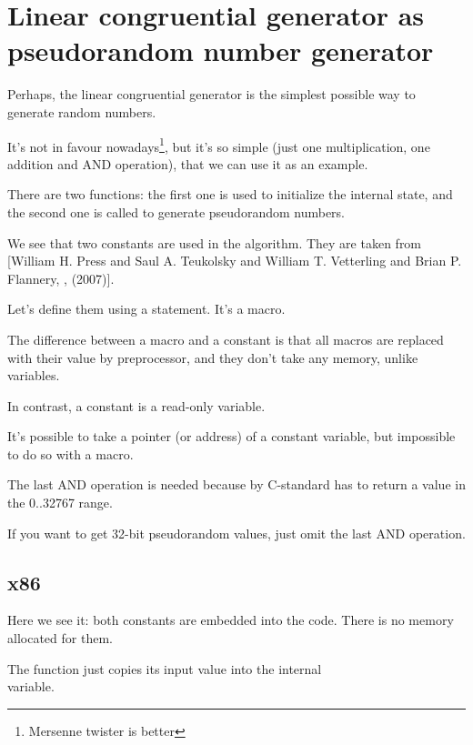 \section[Linear congruential generator]{Linear congruential generator as pseudorandom number generator}
\label{LCG_simple}

Perhaps, the linear congruential generator is the simplest possible way to generate random numbers.

It's not in favour nowadays\footnote{Mersenne twister is better}, but it's so simple 
(just one multiplication, one addition and AND operation), 
that we can use it as an example.



There are two functions: the first one is used to initialize the internal state, and the second one is called
to generate pseudorandom numbers.

We see that two constants are used in the algorithm.
They are taken from
[William H. Press and Saul A. Teukolsky and William T. Vetterling and Brian P. Flannery, , (2007)].

Let's define them using a  \CCpp statement. It's a macro.

The difference between a \CCpp macro and a constant is that all macros are replaced 
with their value by \CCpp preprocessor,
and they don't take any memory, unlike variables.

In contrast, a constant is a read-only variable.

It's possible to take a pointer (or address) of a constant variable, but impossible to do so with a macro.

The last AND operation is needed because by C-standard  has to return a value in 
the 0..32767 range.

If you want to get 32-bit pseudorandom values, just omit the last AND operation.

\subsection{x86}



Here we see it: both constants are embedded into the code.
There is no memory allocated for them.

The  function just copies its input value into the internal\\
 variable.

